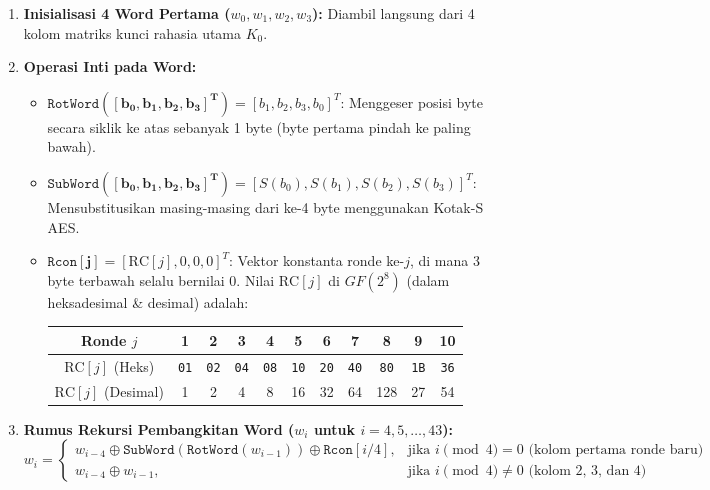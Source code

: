 \documentclass[11pt,a4paper]{article}
\begin{document}
\begin{enumerate}[leftmargin=*]
    \item \textbf{Inisialisasi 4 Word Pertama ($w_0, w_1, w_2, w_3$):} Diambil langsung dari 4 kolom matriks kunci rahasia utama $K_0$.
    \item \textbf{Operasi Inti pada Word:}
    \begin{itemize}
        \item $\mathbf{\mathtt{RotWord}([b_0, b_1, b_2, b_3]^T)} = [b_1, b_2, b_3, b_0]^T$: Menggeser posisi byte secara siklik ke atas sebanyak 1 byte (byte pertama pindah ke paling bawah).
        \item $\mathbf{\mathtt{SubWord}([b_0, b_1, b_2, b_3]^T)} = [S(b_0), S(b_1), S(b_2), S(b_3)]^T$: Mensubstitusikan masing-masing dari ke-4 byte menggunakan Kotak-S AES.
        \item $\mathbf{\mathtt{Rcon}[j]} = [\text{RC}[j], 0, 0, 0]^T$: Vektor konstanta ronde ke-$j$, di mana 3 byte terbawah selalu bernilai 0. Nilai $\text{RC}[j]$ di $GF(2^8)$ (dalam heksadesimal \& desimal) adalah:
        \begin{center}
        \small
        \begin{tabular}{ccccccccccc}
        \toprule
        \textbf{Ronde $j$} & \textbf{1} & \textbf{2} & \textbf{3} & \textbf{4} & \textbf{5} & \textbf{6} & \textbf{7} & \textbf{8} & \textbf{9} & \textbf{10} \\
        \midrule
        $\text{RC}[j]$ (Heks) & \texttt{01} & \texttt{02} & \texttt{04} & \texttt{08} & \texttt{10} & \texttt{20} & \texttt{40} & \texttt{80} & \texttt{1B} & \texttt{36} \\
        $\text{RC}[j]$ (Desimal) & 1 & 2 & 4 & 8 & 16 & 32 & 64 & 128 & 27 & 54 \\
        \bottomrule
        \end{tabular}
        \end{center}
    \end{itemize}
    \item \textbf{Rumus Rekursi Pembangkitan Word ($w_i$ untuk $i = 4, 5, \dots, 43$):}
    \begin{equation}
    w_i = \begin{cases}
    w_{i-4} \oplus \mathtt{SubWord}(\mathtt{RotWord}(w_{i-1})) \oplus \mathtt{Rcon}[i/4], & \text{jika } i \pmod 4 = 0 \text{ (kolom pertama ronde baru)} \\
    w_{i-4} \oplus w_{i-1}, & \text{jika } i \pmod 4 \neq 0 \text{ (kolom 2, 3, dan 4)}
    \end{cases}
    \end{equation}
\end{enumerate}
\end{document}
